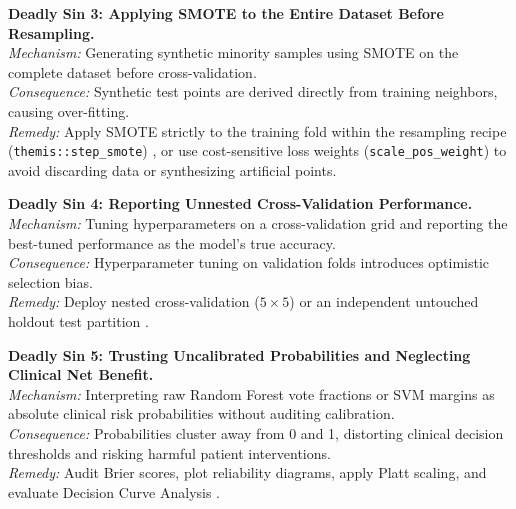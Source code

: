 \documentclass[11pt,oneside]{book}
\begin{document}
\begin{pitfallbox}[top=3pt, bottom=3pt, before skip=3pt, after skip=3pt]
\textbf{Deadly Sin 3: Applying SMOTE to the Entire Dataset Before Resampling.}\\
\textit{Mechanism:} Generating synthetic minority samples using SMOTE on the complete dataset before cross-validation.\\
\textit{Consequence:} Synthetic test points are derived directly from training neighbors, causing over-fitting.\\
\textit{Remedy:} Apply SMOTE strictly to the training fold within the resampling recipe (\texttt{themis::step\_smote}) \cite{chawla2002smote}, or use cost-sensitive loss weights (\texttt{scale\_pos\_weight}) to avoid discarding data or synthesizing artificial points.
\end{pitfallbox}

\begin{pitfallbox}[top=3pt, bottom=3pt, before skip=3pt, after skip=3pt]
\textbf{Deadly Sin 4: Reporting Unnested Cross-Validation Performance.}\\
\textit{Mechanism:} Tuning hyperparameters on a cross-validation grid and reporting the best-tuned performance as the model's true accuracy.\\
\textit{Consequence:} Hyperparameter tuning on validation folds introduces optimistic selection bias.\\
\textit{Remedy:} Deploy nested cross-validation ($5 \times 5$) or an independent untouched holdout test partition \cite{kuhn2013applied}.
\end{pitfallbox}

\begin{pitfallbox}[top=3pt, bottom=3pt, before skip=3pt, after skip=3pt]
\textbf{Deadly Sin 5: Trusting Uncalibrated Probabilities and Neglecting Clinical Net Benefit.}\\
\textit{Mechanism:} Interpreting raw Random Forest vote fractions or SVM margins as absolute clinical risk probabilities without auditing calibration.\\
\textit{Consequence:} Probabilities cluster away from 0 and 1, distorting clinical decision thresholds and risking harmful patient interventions.\\
\textit{Remedy:} Audit Brier scores, plot reliability diagrams, apply Platt scaling, and evaluate Decision Curve Analysis \cite{brier1950verification, vickers2006decision}.
\end{pitfallbox}
\end{document}
